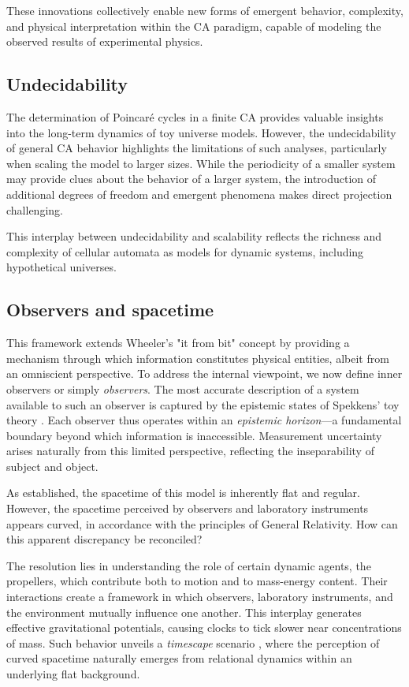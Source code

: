 \documentclass[12pt,english]{article}
\begin{document}
These innovations collectively enable new forms of emergent behavior, complexity, and physical interpretation within the CA paradigm, capable of modeling the observed results of experimental physics.

\subsection{Undecidability}
The determination of Poincaré cycles in a finite CA provides valuable insights into the long-term dynamics of toy universe models. However, the undecidability of general CA behavior highlights the limitations of such analyses, particularly when scaling the model to larger sizes. While the periodicity of a smaller system may provide clues about the behavior of a larger system, the introduction of additional degrees of freedom and emergent phenomena makes direct projection challenging.

This interplay between undecidability and scalability reflects the richness and complexity of cellular automata as models for dynamic systems, including hypothetical universes.

\subsection{Observers and spacetime}  

This framework extends Wheeler's "it from bit" concept by providing a mechanism through which information constitutes physical entities, albeit from an omniscient perspective. To address the internal viewpoint, we now define inner observers or simply \textit{observers}. The most accurate description of a system available to such an observer is captured by the epistemic states of Spekkens’ toy theory \cite{Spekkens2007}. Each observer thus operates within an \textit{epistemic horizon}—a fundamental boundary beyond which information is inaccessible. Measurement uncertainty arises naturally from this limited perspective, reflecting the inseparability of subject and object.

As established, the spacetime of this model is inherently flat and regular. However, the spacetime perceived by observers and laboratory instruments appears curved, in accordance with the principles of General Relativity. How can this apparent discrepancy be reconciled?  

The resolution lies in understanding the role of certain dynamic agents, the propellers, which contribute both to motion and to mass-energy content. Their interactions create a framework in which observers, laboratory instruments, and the environment mutually influence one another. This interplay generates effective gravitational potentials, causing clocks to tick slower near concentrations of mass. Such behavior unveils a \textit{timescape} scenario \cite{duley2013timescape}, where the perception of curved spacetime naturally emerges from relational dynamics within an underlying flat background.
\end{document}
